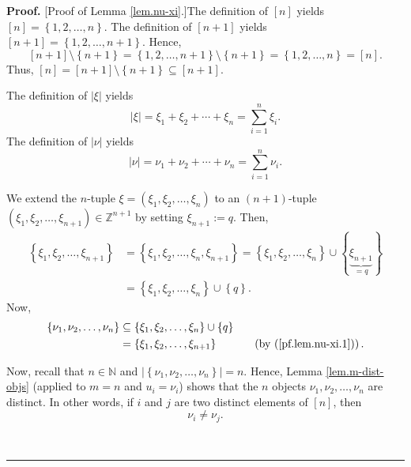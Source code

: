 \documentclass
[numbers=enddot,12pt,final,onecolumn,notitlepage,english]{scrartcl}%
\theoremstyle{definition}
\newenvironment{proof}[1][Proof]{\noindent\textbf{#1.} }{\ \rule{0.5em}{0.5em}}
\let\sumnonlimits\sum
\renewcommand{\sum}{\sumnonlimits\limits}
\newenvironment{verlong}{}{}
\begin{document}
\begin{verlong}
\begin{proof}
[Proof of Lemma \ref{lem.nu-xi}.]The definition of $\left[  n\right]  $ yields
$\left[  n\right]  =\left\{  1,2,\ldots,n\right\}  $. The definition of
$\left[  n+1\right]  $ yields $\left[  n+1\right]  =\left\{  1,2,\ldots
,n+1\right\}  $. Hence,%
\[
\left[  n+1\right]  \setminus\left\{  n+1\right\}  =\left\{  1,2,\ldots
,n+1\right\}  \setminus\left\{  n+1\right\}  =\left\{  1,2,\ldots,n\right\}
=\left[  n\right]  .
\]
Thus, $\left[  n\right]  =\left[  n+1\right]  \setminus\left\{  n+1\right\}
\subseteq\left[  n+1\right]  $.

The definition of $\left\vert \xi\right\vert $ yields
\begin{equation}
\left\vert \xi\right\vert =\xi_{1}+\xi_{2}+\cdots+\xi_{n}=\sum_{i=1}^{n}%
\xi_{i}. \label{pf.lem.nu-xi.sum-xi}%
\end{equation}
The definition of $\left\vert \nu\right\vert $ yields
\begin{equation}
\left\vert \nu\right\vert =\nu_{1}+\nu_{2}+\cdots+\nu_{n}=\sum_{i=1}^{n}%
\nu_{i}. \label{pf.lem.nu-xi.sum-nu}%
\end{equation}


We extend the $n$-tuple $\xi=\left(  \xi_{1},\xi_{2},\ldots,\xi_{n}\right)  $
to an $\left(  n+1\right)  $-tuple $\left(  \xi_{1},\xi_{2},\ldots,\xi
_{n+1}\right)  \in\mathbb{Z}^{n+1}$ by setting $\xi_{n+1}:=q$. Then,%
\begin{align}
\left\{  \xi_{1},\xi_{2},\ldots,\xi_{n+1}\right\}   &  =\left\{  \xi_{1}%
,\xi_{2},\ldots,\xi_{n},\xi_{n+1}\right\}  =\left\{  \xi_{1},\xi_{2}%
,\ldots,\xi_{n}\right\}  \cup\left\{  \underbrace{\xi_{n+1}}_{=q}\right\}
\nonumber\\
&  =\left\{  \xi_{1},\xi_{2},\ldots,\xi_{n}\right\}  \cup\left\{  q\right\}  .
\label{pf.lem.nu-xi.1}%
\end{align}
Now,
\begin{align}
\left\{  \nu_{1},\nu_{2},\ldots,\nu_{n}\right\}   &  \subseteq\left\{  \xi
_{1},\xi_{2},\ldots,\xi_{n}\right\}  \cup\left\{  q\right\} \nonumber\\
&  =\left\{  \xi_{1},\xi_{2},\ldots,\xi_{n+1}\right\}
\ \ \ \ \ \ \ \ \ \ \left(  \text{by (\ref{pf.lem.nu-xi.1})}\right)  .
\label{pf.lem.nu-xi.2}%
\end{align}


Now, recall that $n\in\mathbb{N}$ and $\left\vert \left\{  \nu_{1},\nu
_{2},\ldots,\nu_{n}\right\}  \right\vert =n$. Hence, Lemma
\ref{lem.m-dist-objs} (applied to $m=n$ and $u_{i}=\nu_{i}$) shows that the
$n$ objects $\nu_{1},\nu_{2},\ldots,\nu_{n}$ are distinct. In other words, if
$i$ and $j$ are two distinct elements of $\left[  n\right]  $, then%
\begin{equation}
\nu_{i}\neq\nu_{j}. \label{pf.lem.nu-xi.xipneqetaq}%
\end{equation}



\end{proof}
\end{verlong}
\end{document}
